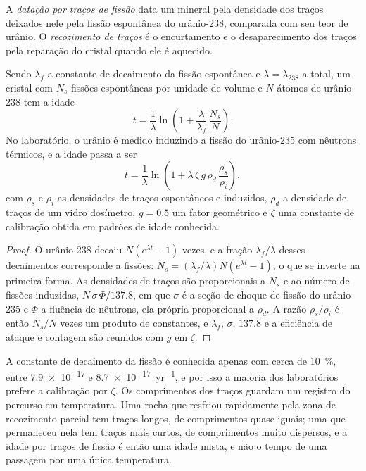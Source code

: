 \begin{definition}\label{def:b3:advanced-geochronology:fission-track}
A \emph{datação por traços de fissão} data um mineral pela
densidade dos traços deixados nele pela fissão espontânea do
urânio-238, comparada com seu teor de urânio. O \emph{recozimento de
traços} é o encurtamento e o desaparecimento dos
traços pela reparação do cristal quando ele é aquecido.
\end{definition}

\begin{theorem}\label{thm:b3:advanced-geochronology:fission-track}
Sendo $\lambda_f$ a constante de decaimento da fissão espontânea e $\lambda =
\lambda_{238}$ a total, um cristal com $N_s$ fissões espontâneas por unidade
de volume e $N$ átomos de urânio-238 tem a idade
\[
t = \frac1\lambda\ln\left(1 + \frac{\lambda}{\lambda_f}\,\frac{N_s}{N}\right).
\]
No laboratório, o urânio é medido induzindo a fissão do
urânio-235 com nêutrons térmicos, e a idade passa a ser
\[
t = \frac1\lambda\ln\left(1 + \lambda\,\zeta\,g\,\rho_d\,\frac{\rho_s}{\rho_i}\right),
\]
com $\rho_s$ e $\rho_i$ as densidades de traços espontâneos e induzidos,
$\rho_d$ a densidade de traços de um vidro dosímetro, $g = 0.5$ um fator geométrico
e $\zeta$ uma constante de calibração obtida em padrões de idade conhecida.
\end{theorem}

\begin{proof}
O urânio-238 decaiu $N(e^{\lambda t} - 1)$ vezes, e a fração
$\lambda_f/\lambda$ desses decaimentos corresponde a fissões: $N_s =
(\lambda_f/\lambda)N(e^{\lambda t} - 1)$, o que se inverte na primeira forma.
As densidades de traços são proporcionais a $N_s$ e ao número de
fissões induzidas, $N\,\sigma\,\Phi/137.8$, em que $\sigma$ é a seção de choque de fissão
do urânio-235 e $\Phi$ a fluência de nêutrons, ela própria
proporcional a $\rho_d$. A razão $\rho_s/\rho_i$ é então $N_s/N$ vezes
um produto de constantes, e $\lambda_f$, $\sigma$, $137.8$ e a eficiência
de ataque e contagem são reunidos com $g$ em $\zeta$.
\end{proof}

A constante de decaimento da fissão é conhecida apenas com cerca de \qty{10}{\percent},
entre \num{7.9e-17} e \qty{8.7e-17}{yr^{-1}}, e por isso a maioria dos
laboratórios prefere a calibração por $\zeta$. Os comprimentos dos traços guardam
um registro do percurso em temperatura. Uma rocha que resfriou rapidamente pela
zona de recozimento parcial tem traços longos, de comprimentos quase iguais; uma que
permaneceu nela tem traços mais curtos, de comprimentos muito dispersos, e a
idade por traços de fissão é então uma idade mista, e não o tempo de uma passagem por
uma única temperatura.

